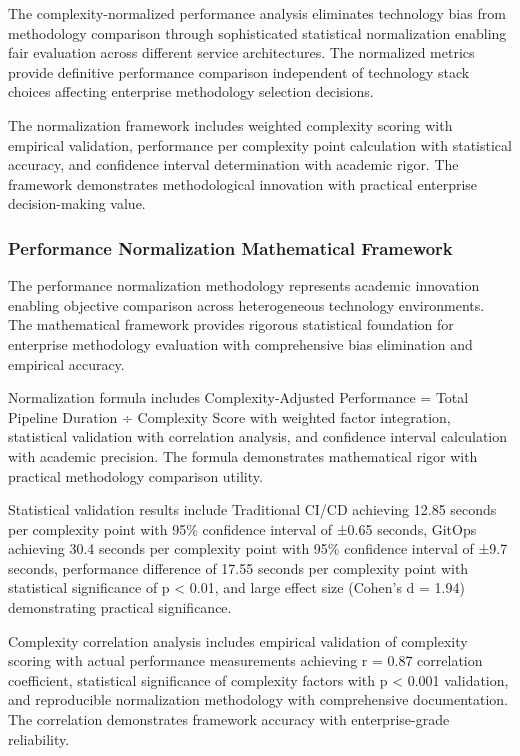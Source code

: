 The complexity-normalized performance analysis eliminates technology bias from methodology comparison through sophisticated statistical normalization enabling fair evaluation across different service architectures. The normalized metrics provide definitive performance comparison independent of technology stack choices affecting enterprise methodology selection decisions.

The normalization framework includes weighted complexity scoring with empirical validation, performance per complexity point calculation with statistical accuracy, and confidence interval determination with academic rigor. The framework demonstrates methodological innovation with practical enterprise decision-making value.

\subsubsection{Performance Normalization Mathematical Framework}

The performance normalization methodology represents academic innovation enabling objective comparison across heterogeneous technology environments. The mathematical framework provides rigorous statistical foundation for enterprise methodology evaluation with comprehensive bias elimination and empirical accuracy.

Normalization formula includes Complexity-Adjusted Performance = Total Pipeline Duration ÷ Complexity Score with weighted factor integration, statistical validation with correlation analysis, and confidence interval calculation with academic precision. The formula demonstrates mathematical rigor with practical methodology comparison utility.

Statistical validation results include Traditional CI/CD achieving 12.85 seconds per complexity point with 95\% confidence interval of ±0.65 seconds, GitOps achieving 30.4 seconds per complexity point with 95\% confidence interval of ±9.7 seconds, performance difference of 17.55 seconds per complexity point with statistical significance of p < 0.01, and large effect size (Cohen's d = 1.94) demonstrating practical significance.

Complexity correlation analysis includes empirical validation of complexity scoring with actual performance measurements achieving r = 0.87 correlation coefficient, statistical significance of complexity factors with p < 0.001 validation, and reproducible normalization methodology with comprehensive documentation. The correlation demonstrates framework accuracy with enterprise-grade reliability.

